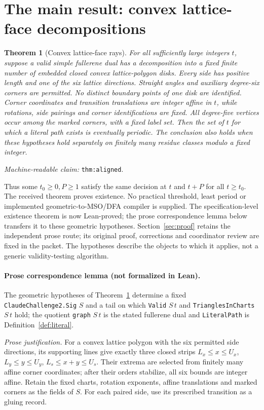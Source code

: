 \documentclass[11pt]{amsart}
\newcommand{\record}[1]{\nolinkurl{#1}}
\newcommand{\claimid}[1]{\par\nopagebreak\noindent\textit{Machine-readable claim:} \record{#1}.\par}
\newtheorem{alignedtheorem}{Theorem}
\theoremstyle{definition}\newtheorem{definition}{Definition}
\begin{document}
\section{The main result: convex lattice-face decompositions}\label{sec:main}
\begin{alignedtheorem}[Convex lattice-face rays]\label{thm:aligned}
For all sufficiently large integers $t$, suppose a valid simple
fullerene dual has a decomposition into a fixed finite number of
embedded closed convex lattice-polygon disks. Every side has positive
length and one of the six lattice directions. Straight angles and
auxiliary degree-six corners are permitted. No distinct boundary
points of one disk are identified. Corner coordinates and transition
translations are integer affine in $t$, while rotations, side pairings
and corner identifications are fixed. All degree-five vertices occur
among the marked corners, with a fixed label set. Then the set of
$t$ for which a literal path exists is eventually periodic.
The conclusion also holds when these hypotheses hold separately on
finitely many residue classes modulo a fixed integer.
\end{alignedtheorem}
\claimid{thm:aligned}
Thus some $t_0\ge0,P\ge1$ satisfy the same decision at $t$ and $t+P$
for all $t\ge t_0$. The received theorem proves existence. No practical
threshold, least period or implemented geometric-to-MSO/DFA compiler
is supplied. The specification-level existence theorem is now
Lean-proved; the prose correspondence lemma below transfers it to
these geometric hypotheses. Section~\ref{sec:proof} retains the
independent prose route; its original proof, corrections and
coordinator review are fixed in the packet. The hypotheses describe the objects
to which it applies, not a generic validity-testing algorithm.


\paragraph{Prose correspondence lemma (not formalized in Lean).}
The geometric hypotheses of Theorem~\ref{thm:aligned} determine a fixed
\record{ClaudeChallenge2.Sig} $S$ and a tail on which
\record{Valid} $S\,t$ and \record{TrianglesInCharts} $S\,t$ hold;
the quotient \record{graph} $S\,t$ is the stated fullerene dual and
\record{LiteralPath} is Definition~\ref{def:literal}.

\emph{Prose justification.}
For a convex lattice polygon with the six permitted side directions,
its supporting lines give exactly three closed strips
$L_x\le x\le U_x$, $L_y\le y\le U_y$,
$L_s\le x+y\le U_s$. Their extrema are selected from finitely many
affine corner coordinates; after their orders stabilize, all six
bounds are integer affine. Retain the fixed charts, rotation exponents,
affine translations and marked corners as the fields of $S$. For each
paired side, use its prescribed transition as a gluing record.
\end{document}

